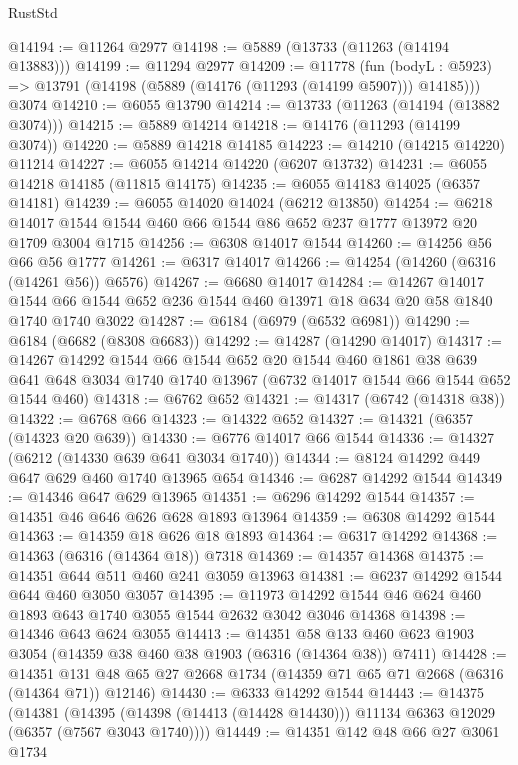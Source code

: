 \begin{lexlean}{RustStd}
\begin{coremodule}
@14194 := @11264 @2977
@14198 := @5889 (@13733 (@11263 (@14194 @13883)))
@14199 := @11294 @2977
@14209 := @11778
    (fun (bodyL : @5923) => @13791 (@14198 (@5889 (@14176 (@11293 (@14199 @5907))) @14185)))
    @3074
@14210 := @6055 @13790
@14214 := @13733 (@11263 (@14194 (@13882 @3074)))
@14215 := @5889 @14214
@14218 := @14176 (@11293 (@14199 @3074))
@14220 := @5889 @14218 @14185
@14223 := @14210 (@14215 @14220) @11214
@14227 := @6055 @14214 @14220 (@6207 @13732)
@14231 := @6055 @14218 @14185 (@11815 @14175)
@14235 := @6055 @14183 @14025 (@6357 @14181)
@14239 := @6055 @14020 @14024 (@6212 @13850)
@14254 := @6218 @14017 @1544 @1544 @460 @66 @1544 @86 @652 @237 @1777 @13972 @20 @1709 @3004 @1715
@14256 := @6308 @14017 @1544
@14260 := @14256 @56 @66 @56 @1777
@14261 := @6317 @14017
@14266 := @14254 (@14260 (@6316 (@14261 @56)) @6576)
@14267 := @6680 @14017
@14284 := @14267
    @14017
    @1544
    @66
    @1544
    @652
    @236
    @1544
    @460
    @13971
    @18
    @634
    @20
    @58
    @1840
    @1740
    @1740
    @3022
@14287 := @6184 (@6979 (@6532 @6981))
@14290 := @6184 (@6682 (@8308 @6683))
@14292 := @14287 (@14290 @14017)
@14317 := @14267
    @14292
    @1544
    @66
    @1544
    @652
    @20
    @1544
    @460
    @1861
    @38
    @639
    @641
    @648
    @3034
    @1740
    @1740
    @13967
    (@6732 @14017 @1544 @66 @1544 @652 @1544 @460)
@14318 := @6762 @652
@14321 := @14317 (@6742 (@14318 @38))
@14322 := @6768 @66
@14323 := @14322 @652
@14327 := @14321 (@6357 (@14323 @20 @639))
@14330 := @6776 @14017 @66 @1544
@14336 := @14327 (@6212 (@14330 @639 @641 @3034 @1740))
@14344 := @8124 @14292 @449 @647 @629 @460 @1740 @13965 @654
@14346 := @6287 @14292 @1544
@14349 := @14346 @647 @629 @13965
@14351 := @6296 @14292 @1544
@14357 := @14351 @46 @646 @626 @628 @1893 @13964
@14359 := @6308 @14292 @1544
@14363 := @14359 @18 @626 @18 @1893
@14364 := @6317 @14292
@14368 := @14363 (@6316 (@14364 @18)) @7318
@14369 := @14357 @14368
@14375 := @14351 @644 @511 @460 @241 @3059 @13963
@14381 := @6237 @14292 @1544 @644 @460 @3050 @3057
@14395 := @11973 @14292 @1544 @46 @624 @460 @1893 @643 @1740 @3055 @1544 @2632 @3042 @3046 @14368
@14398 := @14346 @643 @624 @3055
@14413 := @14351
    @58
    @133
    @460
    @623
    @1903
    @3054
    (@14359 @38 @460 @38 @1903 (@6316 (@14364 @38)) @7411)
@14428 := @14351 @131 @48 @65 @27 @2668 @1734 (@14359 @71 @65 @71 @2668 (@6316 (@14364 @71)) @12146)
@14430 := @6333 @14292 @1544
@14443 := @14375
    (@14381
      (@14395 (@14398 (@14413 (@14428 @14430))) @11134 @6363 @12029 (@6357 (@7567 @3043 @1740))))
@14449 := @14351 @142 @48 @66 @27 @3061 @1734

\end{coremodule}
\end{lexlean}
